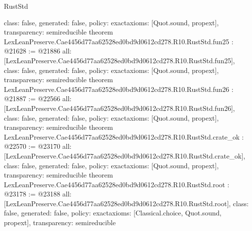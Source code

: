 \begin{lexlean}{RustStd}
\begin{coremodule}
{  class: false,
  generated: false,
  policy: exact{axioms: [Quot.sound, propext]},
  transparency: semireducible
}
theorem LexLeanPreserve.Cae4456d77aa62528ed0bd9d0612cd278.R10.RustStd.fun25 : @21628 := @21886 {
  all: [LexLeanPreserve.Cae4456d77aa62528ed0bd9d0612cd278.R10.RustStd.fun25],
  class: false,
  generated: false,
  policy: exact{axioms: [Quot.sound, propext]},
  transparency: semireducible
}
theorem LexLeanPreserve.Cae4456d77aa62528ed0bd9d0612cd278.R10.RustStd.fun26 : @21887 := @22566 {
  all: [LexLeanPreserve.Cae4456d77aa62528ed0bd9d0612cd278.R10.RustStd.fun26],
  class: false,
  generated: false,
  policy: exact{axioms: [Quot.sound, propext]},
  transparency: semireducible
}
theorem LexLeanPreserve.Cae4456d77aa62528ed0bd9d0612cd278.R10.RustStd.crate_ok : @22570 := @23170 {
  all: [LexLeanPreserve.Cae4456d77aa62528ed0bd9d0612cd278.R10.RustStd.crate_ok],
  class: false,
  generated: false,
  policy: exact{axioms: [Quot.sound, propext]},
  transparency: semireducible
}
theorem LexLeanPreserve.Cae4456d77aa62528ed0bd9d0612cd278.R10.RustStd.root : @23178 := @23188 {
  all: [LexLeanPreserve.Cae4456d77aa62528ed0bd9d0612cd278.R10.RustStd.root],
  class: false,
  generated: false,
  policy: exact{axioms: [Classical.choice, Quot.sound, propext]},
  transparency: semireducible
}


\end{coremodule}
\end{lexlean}
